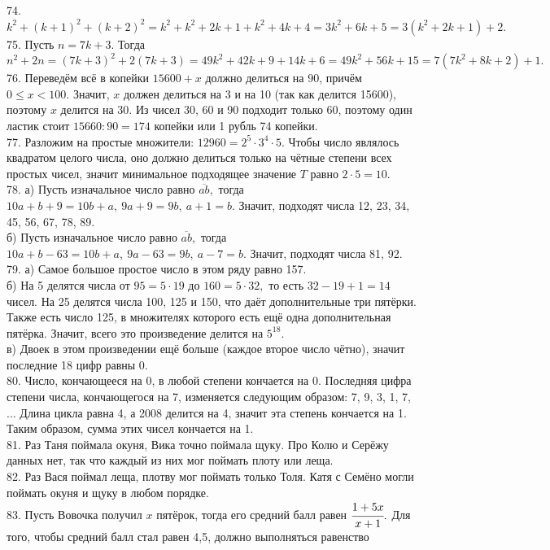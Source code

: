 \documentclass[12pt]{article}
\begin{document}
74. $k^2+(k+1)^2+(k+2)^2=k^2+k^2+2k+1+k^2+4k+4=3k^2+6k+5=3(k^2+2k+1)+2.$\\
75. Пусть $n=7k+3.$ Тогда $n^2+2n=(7k+3)^2+2(7k+3)=49k^2+42k+9+14k+6=49k^2+56k+15=7(7k^2+8k+2)+1.$\\
76. Переведём всё в копейки $15600+x$ должно делиться на 90, причём $0\leqslant x <100.$ Значит, $x$ должен делиться на 3 и на 10 (так как делится 15600), поэтому $x$ делится на 30. Из чисел 30, 60 и 90 подходит только 60, поэтому один ластик стоит $15660:90=174$ копейки или 1 рубль 74 копейки.\\
77. Разложим на простые множители: $12960=2^5\cdot3^4\cdot5.$ Чтобы число являлось квадратом целого числа, оно должно делиться только на чётные степени всех простых чисел, значит минимальное подходящее значение $T$ равно $2\cdot5=10.$\\
78. а) Пусть изначальное число равно $\overline{ab},$ тогда $10a+b+9=10b+a,\ 9a+9=9b,\ a+1=b.$ Значит, подходят числа 12, 23, 34, 45, 56, 67, 78, 89.\\
б) Пусть изначальное число равно $\overline{ab},$ тогда $10a+b-63=10b+a,\ 9a-63=9b,\ a-7=b.$ Значит, подходят числа 81, 92.\\
79. а) Самое большое простое число в этом ряду равно 157.\\
б) На 5 делятся числа от $95=5\cdot19$ до $160=5\cdot32,$ то есть $32-19+1=14$ чисел. На 25 делятся числа 100, 125 и 150, что даёт дополнительные три пятёрки. Также есть число 125, в множителях которого есть ещё одна дополнительная пятёрка. Значит, всего это произведение делится на $5^{18}.$\\
в) Двоек в этом произведении ещё больше (каждое второе число чётно), значит последние 18 цифр равны 0.\\
80. Число, кончающееся на 0, в любой степени кончается на 0. Последняя цифра степени числа, кончающегося на 7, изменяется следующим образом: 7, 9, 3, 1, 7, ...
Длина цикла равна 4, а 2008 делится на 4, значит эта степень кончается на 1. Таким образом, сумма этих чисел кончается на 1.\\
81. Раз Таня поймала окуня, Вика точно поймала щуку. Про Колю и Серёжу данных нет, так что каждый из них мог поймать плоту или леща.\\
82. Раз Вася поймал леща, плотву мог поймать только Толя. Катя с Семёно могли поймать окуня и щуку в любом порядке.\\
83. Пусть Вовочка получил $x$ пятёрок, тогда его средний балл равен $\cfrac{1+5x}{x+1}.$ Для того, чтобы средний балл стал равен 4,5, должно выполняться равенство
\end{document}
